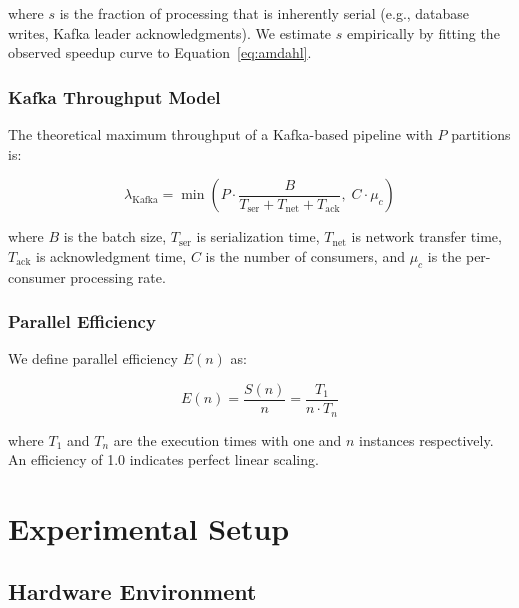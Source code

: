 \documentclass[journal]{IEEEtran}
\begin{document}
where $s$ is the fraction of processing that is inherently serial (e.g., database writes, Kafka leader acknowledgments). We estimate $s$ empirically by fitting the observed speedup curve to Equation~\ref{eq:amdahl}.

\subsubsection{Kafka Throughput Model}

The theoretical maximum throughput of a Kafka-based pipeline with $P$ partitions is:

\begin{equation}
\lambda_{\text{Kafka}} = \min\left(P \cdot \frac{B}{T_{\text{ser}} + T_{\text{net}} + T_{\text{ack}}},\; C \cdot \mu_c\right)
\label{eq:kafka_throughput}
\end{equation}

where $B$ is the batch size, $T_{\text{ser}}$ is serialization time, $T_{\text{net}}$ is network transfer time, $T_{\text{ack}}$ is acknowledgment time, $C$ is the number of consumers, and $\mu_c$ is the per-consumer processing rate.

\subsubsection{Parallel Efficiency}

We define parallel efficiency $E(n)$ as:

\begin{equation}
E(n) = \frac{S(n)}{n} = \frac{T_1}{n \cdot T_n}
\label{eq:efficiency}
\end{equation}

where $T_1$ and $T_n$ are the execution times with one and $n$ instances respectively. An efficiency of 1.0 indicates perfect linear scaling.


\section{Experimental Setup}
\label{sec:experimental_setup}


\subsection{Hardware Environment}
\label{subsec:hardware}
\end{document}
